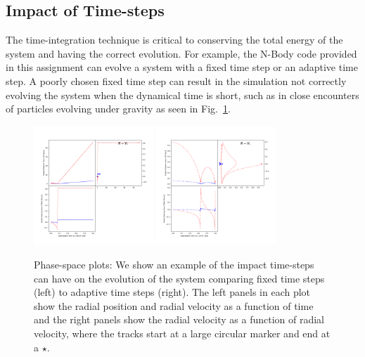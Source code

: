 \subsection{Impact of Time-steps}
\label{sec:nbody:timestep}
The time-integration technique is critical to conserving the total energy of the system and having the correct evolution. For example, the N-Body code provided in this assignment can evolve a system with a fixed time step or an adaptive time step. A poorly chosen fixed time step can result in the simulation not correctly evolving the system when the dynamical time is short, such as in close encounters of particles evolving under gravity as seen in Fig.~\ref{fig:nbody-orbits}. 
\begin{figure}[!h]	
	\centering
	\includegraphics[width=0.4\textwidth, valign=c, clip=true, trim=1.cm 2.cm 1.cm 2.cm]{figs/nbody-phase-plot-rad-static.png}
	\includegraphics[width=0.4\textwidth, valign=c, clip=true, trim=1.cm 2.cm 1.cm 2.cm]{figs/nbody-phase-plot-rad-adaptive.png}
	\caption{Phase-space plots: We show an example of the impact time-steps can have on the evolution of the system comparing fixed time steps (left) to adaptive time steps (right). The left panels in each plot show the radial position and radial velocity as a function of time and the right panels show the radial velocity as a function of radial velocity, where the tracks start at a large circular marker and end at a $\star$.}
	\label{fig:nbody-orbits}
\end{figure}

